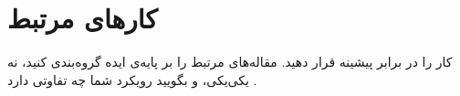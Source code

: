 \section{کارهای مرتبط}
کار را در برابر پیشینه قرار دهید. مقاله‌های مرتبط را بر پایه‌ی ایده گروه‌بندی کنید، نه یکی‌یکی، و بگویید
رویکرد شما چه تفاوتی دارد \cite{knuth1984,lamport1994}.
